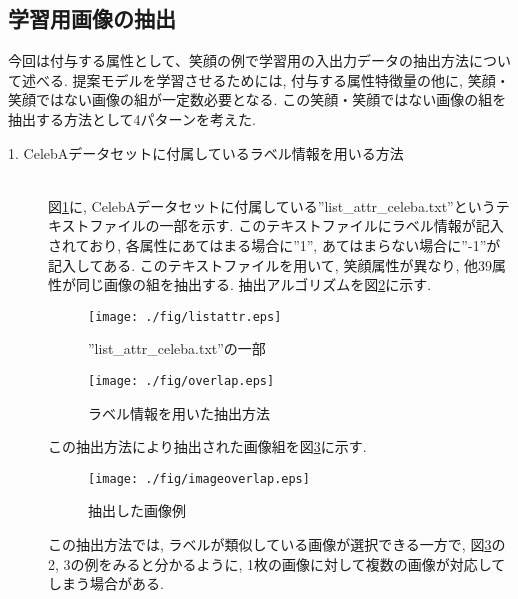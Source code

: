 \subsection{学習用画像の抽出}
今回は付与する属性として、笑顔の例で学習用の入出力データの抽出方法について述べる. 提案モデルを学習させるためには, 付与する属性特徴量の他に, 笑顔・笑顔ではない画像の組が一定数必要となる. この笑顔・笑顔ではない画像の組を抽出する方法として4パターンを考えた. 

\begin{description}
\item[1. CelebAデータセットに付属しているラベル情報を用いる方法]\mbox{}\\ 

図\ref{fig:listattr}に, CelebAデータセットに付属している”list\_attr\_celeba.txt”というテキストファイルの一部を示す. このテキストファイルにラベル情報が記入されており, 各属性にあてはまる場合に”1”, あてはまらない場合に”-1”が記入してある. このテキストファイルを用いて, 笑顔属性が異なり, 他39属性が同じ画像の組を抽出する. 抽出アルゴリズムを図\ref{fig:overlap}に示す. 

\begin{figure}[H]
 	\begin{center}
 		\texttt{[image: ./fig/listattr.eps]}
 		\caption{”list\_attr\_celeba.txt”の一部}
 		\label{fig:listattr}
 	\end{center}
 \end{figure}
 \begin{figure}[H]
 	\begin{center}
 		\texttt{[image: ./fig/overlap.eps]}
 		\caption{ラベル情報を用いた抽出方法}
 		\label{fig:overlap}
 	\end{center}
 \end{figure}
 
この抽出方法により抽出された画像組を図\ref{fig:imageoverlap}に示す. 
\begin{figure}[H]
 	\begin{center}
 		\texttt{[image: ./fig/imageoverlap.eps]}
 		\caption{抽出した画像例}
 		\label{fig:imageoverlap}
 	\end{center}
 \end{figure}

この抽出方法では, ラベルが類似している画像が選択できる一方で, 図\ref{fig:imageoverlap}の2, 3の例をみると分かるように, 1枚の画像に対して複数の画像が対応してしまう場合がある. 


\end{description}
